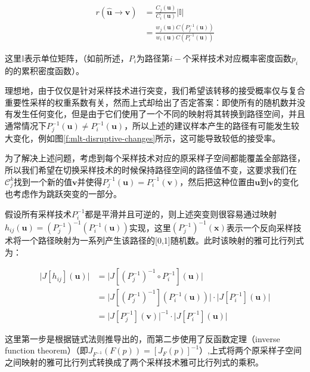 \begin{equation}
\begin{aligned}
	r(\hat{\mathbf{u}}\to\hat{\mathbf{v}})&=\frac{C_j({\mathbf{u}})}{C_i({\mathbf{u}})}|\mathds{I}|\\
	&=\frac{w_j({\mathbf{u}})C(P^{-1}_j({\mathbf{u}}))}{w_i({\mathbf{u}})C(P^{-1}_i({\mathbf{u}}))}
\end{aligned}
\end{equation}

\noindent 这里$\mathds{I}$表示单位矩阵，（如前所述，$P_i$为路径第$i-$个采样技术对应概率密度函数$p_i$的的累积密度函数）。

理想地，由于仅仅是针对采样技术进行突变，我们希望该转移的接受概率仅与复合重要性采样的权重系数有关，然而上式却给出了否定答案：即使所有的随机数并没有发生任何变化，但是由于它们使用了一个不同的映射将其转换到路径空间，并且通常情况下$P^{-1}_j({\mathbf{u}})\neq P^{-1}_i({\mathbf{u}})$，所以上述的建议样本产生的路径有可能发生较大变化，例如图\ref{f:mlt-disruptive-changes}所示，这可能导致较低的接受率。

为了解决上述问题，考虑到每个采样技术对应的原采样子空间都能覆盖全部路径，所以我们希望在切换采样技术的时候保持路径空间的路径值不变，这要求我们在$\mathscr{C}^{k}_j$找到一个新的值${\mathbf{v}}$并使得$P^{-1}_j({\mathbf{u}})=P^{-1}_i({\mathbf{v}})$，然后把这种位置由${\mathbf{u}}$到${\mathbf{v}}$的变化也考虑作为跳跃突变的一部分。

假设所有采样技术$P^{-1}_i$都是平滑并且可逆的，则上述突变则很容易通过映射$h_{ij}({\mathbf{u}})=(P^{-1}_j)^{-1}(P^{-1}_i({\mathbf{u}}))$实现，这里$(P^{-1}_j)^{-1}({\mathbf{x}})$表示一个反向采样技术将一个路径映射为一系列产生该路径的[0,1]随机数。此时该映射的雅可比行列式为：

\begin{equation}
\begin{aligned}
	\big|J[h_{ij}]({\mathbf{u}})\big|&=\big|J[(P^{-1}_j)^{-1}\circ P^{-1}_i]({\mathbf{u}})\big|\\
	&=\big|J[(P^{-1}_j)^{-1}](P^{-1}_i({\mathbf{u}}))\big|\cdot\big|J[P^{-1}_i]({\mathbf{u}})\big|\\
	&=\big|J[P^{-1}_j]({\mathbf{v}})\big|^{-1}\cdot\big|J[P^{-1}_i]({\mathbf{u}})\big|
\end{aligned}
\end{equation}

\noindent 这里第一步是根据链式法则推导出的，而第二步使用了反函数定理（inverse function theorem）（即$J_{F^{-1}}(F(p))=[J_F(p)]^{-1}$）,上式将两个原采样子空间之间映射的雅可比行列式转换成了两个采样技术雅可比行列式的乘积。

